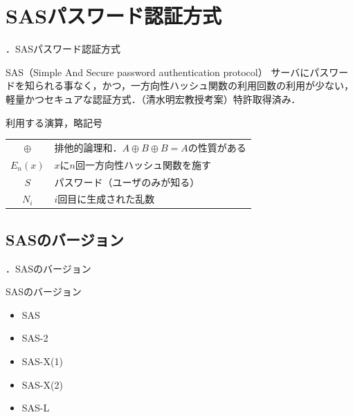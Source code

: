 \documentclass[aspectratio=43]{beamer}
\newcommand{\showsec}{\thesection ．}
\begin{document}
\section{SASパスワード認証方式}
\begin{frame}{\thesection ．SASパスワード認証方式}
    \begin{block}{SAS（Simple And Secure password authentication protocol）}
        サーバにパスワードを知られる事なく，かつ，一方向性ハッシュ関数の利用回数の利用が少ない，軽量かつセキュアな認証方式．（清水明宏教授考案）特許取得済み．
    \end{block}
    \begin{block}{利用する演算，略記号}
        \begin{tabular}{cl}
            \(\oplus\) & 排他的論理和．\(A\oplus B \oplus B = A\)の性質がある \\
            \(E_n(x)\) & \(x\)に\(n\)回一方向性ハッシュ関数を施す               \\
            \(S\)      & パスワード（ユーザのみが知る）                         \\
            \(N_i\)    & \(i\)回目に生成された乱数
        \end{tabular}
    \end{block}
\end{frame}
\subsection{SASのバージョン}
\begin{frame}{\showsec SASのバージョン}
    \begin{block}{SASのバージョン}
        \begin{itemize}
            \item<1>    SAS
            \item<1-2>  SAS-2
            \item<1>    SAS-X(1)
            \item<1>    SAS-X(2)
            \item<1>    SAS-L
        \end{itemize}
    \end{block}
\end{frame}
\end{document}
